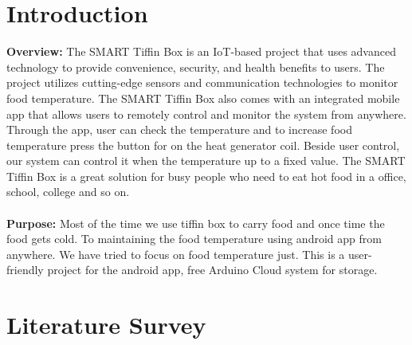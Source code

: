 \documentclass[conference]{IEEEtran}
\begin{document}
\section{Introduction}
\textbf{Overview:} The SMART Tiffin Box is an IoT-based project that uses advanced technology to provide convenience, security, and health benefits to users. The project utilizes cutting-edge sensors and communication technologies to monitor food temperature. The SMART Tiffin Box also comes with an integrated mobile app that allows users to remotely control and monitor the system from anywhere. Through the app, user can check the temperature and to increase food temperature press the button for on the heat generator coil. Beside user control, our system can control it when the temperature up to a fixed value. The SMART Tiffin Box is a great solution for busy people who need to eat hot food in a office, school, college and so on. \\\\
\textbf{Purpose:} Most of the time we use tiffin box to carry food and once time the food gets cold. To maintaining the food temperature using android app from anywhere. We have tried to focus on food temperature just. This is a user-friendly project for the android app, free Arduino Cloud system for storage. 

\section{Literature Survey}
\end{document}
